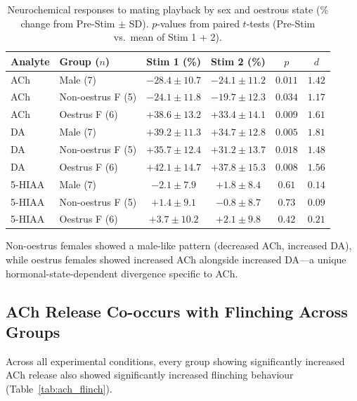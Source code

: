 \documentclass[11pt]{article}
\begin{document}
\begin{table}[H]
\centering
\caption{Neurochemical responses to mating playback by sex and oestrous state (\% change from Pre-Stim $\pm$ SD). $p$-values from paired $t$-tests (Pre-Stim vs.\ mean of Stim 1 + 2).}
\label{tab:sex_neurochemistry}
\begin{tabular}{llcccc}
\toprule
Analyte & Group ($n$) & Stim 1 (\%) & Stim 2 (\%) & $p$ & $d$ \\
\midrule
ACh & Male (7) & $-28.4 \pm 10.7$ & $-24.1 \pm 11.2$ & $0.011$ & $1.42$ \\
ACh & Non-oestrus F (5) & $-24.1 \pm 11.8$ & $-19.7 \pm 12.3$ & $0.034$ & $1.17$ \\
ACh & Oestrus F (6) & $+38.6 \pm 13.2$ & $+33.4 \pm 14.1$ & $0.009$ & $1.61$ \\
\midrule
DA & Male (7) & $+39.2 \pm 11.3$ & $+34.7 \pm 12.8$ & $0.005$ & $1.81$ \\
DA & Non-oestrus F (5) & $+35.7 \pm 12.4$ & $+31.2 \pm 13.7$ & $0.018$ & $1.48$ \\
DA & Oestrus F (6) & $+42.1 \pm 14.7$ & $+37.8 \pm 15.3$ & $0.008$ & $1.56$ \\
\midrule
5-HIAA & Male (7) & $-2.1 \pm 7.9$ & $+1.8 \pm 8.4$ & $0.61$ & $0.14$ \\
5-HIAA & Non-oestrus F (5) & $+1.4 \pm 9.1$ & $-0.8 \pm 8.7$ & $0.73$ & $0.09$ \\
5-HIAA & Oestrus F (6) & $+3.7 \pm 10.2$ & $+2.1 \pm 9.8$ & $0.42$ & $0.21$ \\
\bottomrule
\end{tabular}
\end{table}

Non-oestrus females showed a male-like pattern (decreased ACh, increased DA), while oestrus females showed increased ACh alongside increased DA---a unique hormonal-state-dependent divergence specific to ACh.

\subsection{ACh Release Co-occurs with Flinching Across Groups}

Across all experimental conditions, every group showing significantly increased ACh release also showed significantly increased flinching behaviour (Table~\ref{tab:ach_flinch}).
\end{document}
